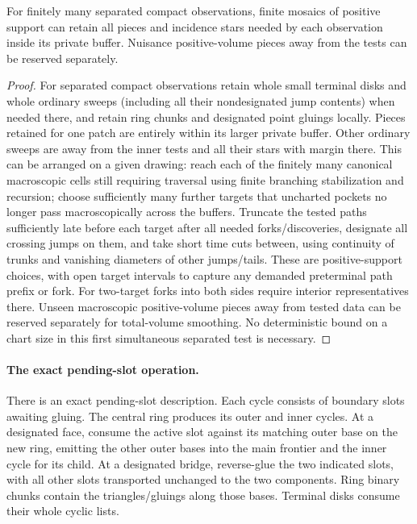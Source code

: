 \begin{lemma}\label{kern:retention}
For finitely many separated compact observations, finite mosaics of positive support can retain
all pieces and incidence stars needed by each observation inside its private buffer. Nuisance
positive-volume pieces away from the tests can be reserved separately.
\end{lemma}
\begin{proof}

For separated compact observations retain whole small terminal disks and whole ordinary sweeps (including
all their nondesignated jump contents) when needed there, and retain ring chunks and designated point
gluings locally. Pieces retained for one patch are entirely within its larger private buffer. Other ordinary
sweeps are away from the inner tests and all their stars with margin there. This can be arranged on a given
drawing: reach each of the finitely many canonical macroscopic cells still requiring traversal using finite
branching stabilization and recursion; choose sufficiently many further targets that uncharted pockets no
longer pass macroscopically across the buffers. Truncate the tested paths sufficiently late before each
target after all needed forks/discoveries, designate all crossing jumps on them, and take short time cuts
between, using continuity of trunks and vanishing diameters of other jumps/tails. These are positive-support
choices, with open target intervals to capture any demanded preterminal path prefix or fork. For two-target
forks into both sides require interior representatives there. Unseen macroscopic positive-volume pieces away
from tested data can be reserved separately for total-volume smoothing. No deterministic bound on a chart
size in this first simultaneous separated test is necessary.

\end{proof}

\paragraph{The exact pending-slot operation.}

There is an exact pending-slot description. Each cycle consists of boundary slots awaiting gluing. The
central ring produces its outer and inner cycles. At a designated face, consume the active slot against its
matching outer base on the new ring, emitting the other outer bases into the main frontier and the inner
cycle for its child. At a designated bridge, reverse-glue the two indicated slots, with all other slots
transported unchanged to the two components. Ring binary chunks contain the triangles/gluings along those
bases. Terminal disks consume their whole cyclic lists.

